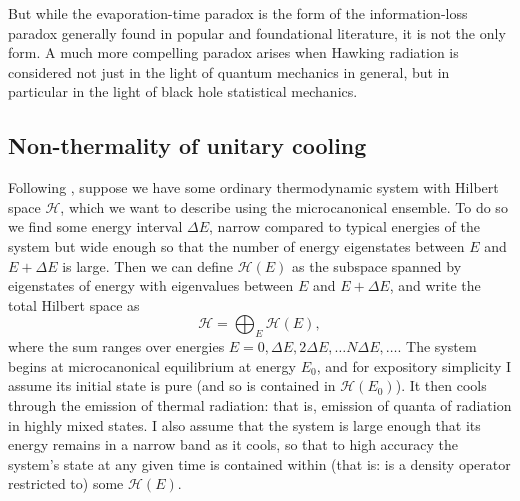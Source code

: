 \documentclass[12pt]{article}
\newcommand{\mc}[1]{\ensuremath{\mathcal{#1}}}
\newcommand{\be}{\begin{equation}}
\newcommand{\ee}{\end{equation}}
\begin{document}
But while the evaporation-time paradox is the form of the information-loss paradox generally found in popular and foundational literature, it is not the only form. A much more compelling paradox arises when Hawking radiation is considered not just in the light of quantum mechanics in general, but in particular in the light of black hole statistical mechanics.


\subsection{Non-thermality of unitary cooling} 

Following , suppose we have some ordinary thermodynamic system with Hilbert space $\mc{H}$, which we want to describe using the microcanonical ensemble. To do so we find some energy interval $\Delta E$, narrow compared to typical energies of the system but wide enough so that the number of energy eigenstates between $E$ and $E+\Delta E$ is large. Then we can define $\mc{H}(E)$ as the subspace spanned by eigenstates of energy with eigenvalues between $E$ and $E+\Delta E$, and write the total Hilbert space as
\be
\mc{H}=\bigoplus_E \mc{H}(E),
\ee
where the sum ranges over energies $E=0,\Delta E, 2 \Delta E, \ldots N \Delta E,\ldots$. The system begins at microcanonical equilibrium at energy $E_0$, and for expository simplicity I assume its initial state is pure (and so is contained in $\mc{H}(E_0)$). It then cools through the emission of thermal radiation: that is, emission of quanta of radiation in highly mixed states. I also assume that the system is large enough that its energy remains in a narrow band as it cools, so that to high accuracy the system's state at any given time is contained within (that is: is a density operator restricted to) some $\mc{H}(E)$.
\end{document}
